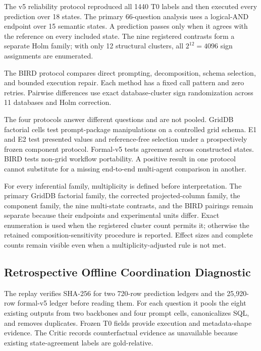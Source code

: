 \documentclass[applsci,article,submit,moreauthors]{Definitions/mdpi}
\begin{document}
The v5 reliability protocol reproduced all 1440 T0 labels and then executed every prediction over 18 states. The primary 66-question analysis uses a logical-AND endpoint over 15 semantic states. A prediction passes only when it agrees with the reference on every included state. The nine registered contrasts form a separate Holm family; with only 12 structural clusters, all $2^{12}=4096$ sign assignments are enumerated.

The BIRD protocol compares direct prompting, decomposition, schema selection, and bounded execution repair. Each method has a fixed call pattern and zero retries. Pairwise differences use exact database-cluster sign randomization across 11 databases and Holm correction.

The four protocols answer different questions and are not pooled. GridDB factorial cells test prompt-package manipulations on a controlled grid schema. E1 and E2 test presented values and reference-free selection under a prospectively frozen component protocol. Formal-v5 tests agreement across constructed states. BIRD tests non-grid workflow portability. A positive result in one protocol cannot substitute for a missing end-to-end multi-agent comparison in another.

For every inferential family, multiplicity is defined before interpretation. The primary GridDB factorial family, the corrected projected-column family, the component family, the nine multi-state contrasts, and the BIRD pairings remain separate because their endpoints and experimental units differ. Exact enumeration is used when the registered cluster count permits it; otherwise the retained composition-sensitivity procedure is reported. Effect sizes and complete counts remain visible even when a multiplicity-adjusted rule is not met.

\subsection{Retrospective Offline Coordination Diagnostic}

The replay verifies SHA-256 for two 720-row prediction ledgers and the 25,920-row formal-v5 ledger before reading them. For each question it pools the eight existing outputs from two backbones and four prompt cells, canonicalizes SQL, and removes duplicates. Frozen T0 fields provide execution and metadata-shape evidence. The Critic records counterfactual evidence as unavailable because existing state-agreement labels are gold-relative.
\end{document}
